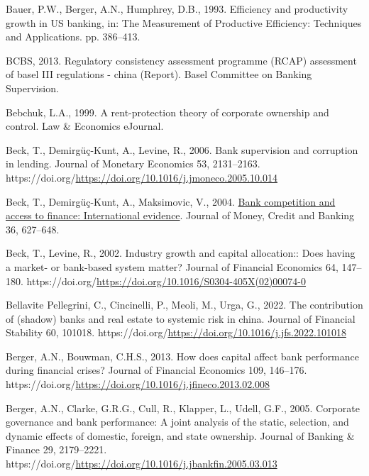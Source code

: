 \documentclass[
  12pt,
  a4paper,
]{scrreprt}
\newlength{\cslhangindent}
\newenvironment{CSLReferences}[2] %
 {\begin{list}{}{%
  \setlength{\itemindent}{0pt}
  \setlength{\leftmargin}{0pt}
  \setlength{\parsep}{0pt}
  \ifodd #1
   \setlength{\leftmargin}{\cslhangindent}
   \setlength{\itemindent}{-1\cslhangindent}
  \fi
  \setlength{\itemsep}{#2\baselineskip}}}
 {\end{list}}
\begin{document}
{{{{\begin{CSLReferences}{1}{0}
Bauer, P.W., Berger, A.N., Humphrey, D.B., 1993. Efficiency and
productivity growth in US banking, in: The Measurement of Productive
Efficiency: Techniques and Applications. pp. 386--413.

BCBS, 2013. Regulatory consistency assessment programme (RCAP)
assessment of basel III regulations - china (Report). Basel Committee on
Banking Supervision.

Bebchuk, L.A., 1999. A rent-protection theory of corporate ownership and
control. Law \& Economics eJournal.

Beck, T., Demirgüç-Kunt, A., Levine, R., 2006. Bank supervision and
corruption in lending. Journal of Monetary Economics 53, 2131--2163.
https://doi.org/\url{https://doi.org/10.1016/j.jmoneco.2005.10.014}

Beck, T., Demirgüç-Kunt, A., Maksimovic, V., 2004.
\href{http://www.jstor.org.queens.ezp1.qub.ac.uk/stable/3838958}{Bank
competition and access to finance: International evidence}. Journal of
Money, Credit and Banking 36, 627--648.

Beck, T., Levine, R., 2002. Industry growth and capital allocation::
Does having a market- or bank-based system matter? Journal of Financial
Economics 64, 147--180.
https://doi.org/\url{https://doi.org/10.1016/S0304-405X(02)00074-0}

Bellavite Pellegrini, C., Cincinelli, P., Meoli, M., Urga, G., 2022. The
contribution of (shadow) banks and real estate to systemic risk in
china. Journal of Financial Stability 60, 101018.
https://doi.org/\url{https://doi.org/10.1016/j.jfs.2022.101018}

Berger, A.N., Bouwman, C.H.S., 2013. How does capital affect bank
performance during financial crises? Journal of Financial Economics 109,
146--176.
https://doi.org/\url{https://doi.org/10.1016/j.jfineco.2013.02.008}

Berger, A.N., Clarke, G.R.G., Cull, R., Klapper, L., Udell, G.F., 2005.
Corporate governance and bank performance: A joint analysis of the
static, selection, and dynamic effects of domestic, foreign, and state
ownership. Journal of Banking \& Finance 29, 2179--2221.
https://doi.org/\url{https://doi.org/10.1016/j.jbankfin.2005.03.013}


\end{CSLReferences}}}}}
\end{document}
